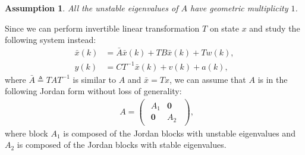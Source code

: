 \documentclass[12pt]{article}  %
\newcommand{\Cb}{{\mathbb{C}}}
\newcommand{\Uc}{{\mathcal{U}}}
\newtheorem{assumption}{\textbf{Assumption}}
\begin{document}
\begin{assumption}\label{as:geo_unstable}
	All the unstable eigenvalues of $A$ have geometric multiplicity $1$. 
\end{assumption}
Since we can perform invertible linear transformation $T$ on state $x$ and study the following system instead:
\begin{align*}
\bar{x}(k)&= \bar{A} \bar{x}(k) + TB\bar{x}(k)+Tw(k),  \\
y(k)&=CT^{-1}\bar{x}(k)+v(k)+a(k) ,
\end{align*}
where $\bar{A}\triangleq TAT^{-1}$ is similar to $A$ and $\bar{x}=Tx$, we can assume that $A$ is in the following Jordan form without loss of generality:
	\begin{align*}
	&A=
	\begin{pmatrix}
	\begin{array}{cc}
	A_1 & \mathbf{0} \\
	\mathbf{0} & A_2			
	\end{array}
	\end{pmatrix}, \
	\end{align*}
	where block $A_1$ is composed of the Jordan blocks with unstable eigenvalues and $A_2$ is composed of the Jordan blocks with stable eigenvalues. 
\end{document}
